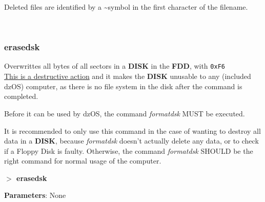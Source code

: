 \documentclass[a4paper,11pt]{article}
\begin{document}
        Deleted files are identified by a \textasciitilde symbol in the first
        character of the filename.

        \texttt{
        }

        \subsubsection{{\color{blue}erasedsk}}
        Overwrittes all bytes of all sectors in a \textbf{DISK} in the
        \textbf{FDD}, with \texttt{0xF6} \\

        \underline{This is a destructive action} and it makes the \textbf{DISK}
        unusable to any (included dzOS) computer, as there is no file system in
        the disk after the command is completed.
        
        Before it can be used by dzOS, the command \textit{formatdsk} MUST be
        executed.

        It is recommended to only use this command in the case of wanting to
        destroy all data in a \textbf{DISK}, because \textit{formatdsk} doesn't
        actually delete any data, or to check if a Floppy Disk is faulty.
        Otherwise, the command \textit{formatdsk} SHOULD be the right command
        for normal usage of the computer.

        \hspace{1.9cm}\textbf{$>$ erasedsk}

        \textbf{Parameters}: None
\end{document}
